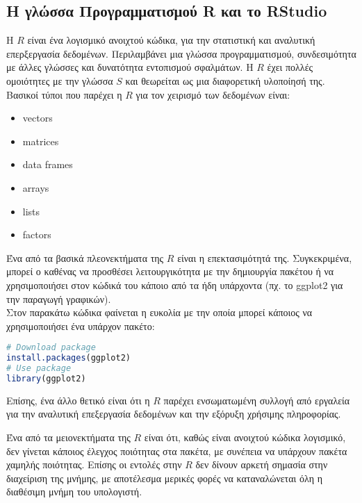\documentclass[12pt,a4paper,final]{article}
\begin{document}
\subsection{Η γλώσσα Προγραμματισμού \foreignlanguage{english}{R} και το \foreignlanguage{english}{RStudio}}
 H $R$  \foreignlanguage{english}{\cite{R}} είναι ένα λογισμικό ανοιχτού κώδικα,  για την στατιστική και αναλυτική επερξεργασία δεδομένων. Περιλαμβάνει μια γλώσσα προγραμματισμού, συνδεσιμότητα με άλλες γλώσσες και δυνατότητα εντοπισμού σφαλμάτων. Η $R$ έχει πολλές ομοιότητες με την γλώσσα $S$ \foreignlanguage{english}{\cite{S}} και  θεωρείται ως μια διαφορετική υλοποίησή της.
  Βασικοί τύποι που παρέχει η $R$ για τον χειρισμό των δεδομένων είναι:
\begin{itemize}
	\item \foreignlanguage{english}{vectors}
	\item \foreignlanguage{english}{matrices}
	\item \foreignlanguage{english}{data frames}
	\item \foreignlanguage{english}{arrays}
	\item \foreignlanguage{english}{lists}
	\item \foreignlanguage{english}{factors}
\end{itemize}    
Ένα από τα βασικά πλεονεκτήματα της $R$ είναι η επεκτασιμότητά της. Συγκεκριμένα, μπορεί ο καθένας να προσθέσει λειτουργικότητα με την δημιουργία πακέτου ή  να χρησιμοποιήσει στον κώδικά του κάποιο από τα ήδη υπάρχοντα
(πχ. το \foreignlanguage{english}{ggplot2} για την παραγωγή γραφικών).\\
Στον παρακάτω κώδικα φαίνεται η ευκολία με την οποία μπορεί κάποιος να χρησιμοποιήσει ένα υπάρχον πακέτο:
\begin{lstlisting}[language=R]
# Download package
install.packages(ggplot2)
# Use package
library(ggplot2)
\end{lstlisting}
Επίσης, ένα άλλο θετικό είναι ότι η $R$ παρέχει ενσωματωμένη συλλογή από εργαλεία για την αναλυτική επεξεργασία δεδομένων και την εξόρυξη χρήσιμης πληροφορίας. \medskip

Ένα από τα μειονεκτήματα της $R$ είναι ότι, καθώς είναι ανοιχτού κώδικα λογισμικό, δεν 
γίνεται κάποιος έλεγχος ποιότητας στα πακέτα, με συνέπεια να υπάρχουν πακέτα χαμηλής ποιότητας. Επίσης οι εντολές στην $R$ δεν δίνουν αρκετή σημασία στην διαχείριση της μνήμης, με αποτέλεσμα μερικές φορές να καταναλώνεται όλη η διαθέσιμη μνήμη του υπολογιστή. \medskip
\end{document}
